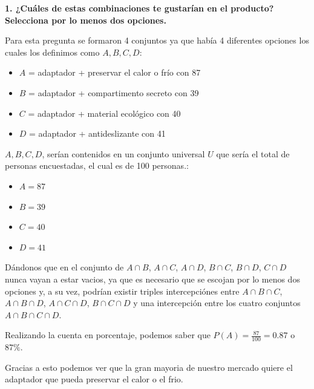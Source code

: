 \textbf{1. ¿Cuáles de estas combinaciones te gustarían en el producto? Selecciona por lo menos dos opciones.}

\tab Para esta pregunta se formaron 4 conjuntos ya que había 4 diferentes opciones los cuales los definimos como $A,B,C,D$:

\begin{itemize}
    \item $A$ = adaptador + preservar el calor o frío con 87
    \item $B$ = adaptador + compartimento secreto con 39
    \item $C$ = adaptador + material ecológico con 40
    \item $D$ = adaptador + antideslizante con 41
\end{itemize}

\tab $A,B,C,D$, serían contenidos en un conjunto universal $U$ que sería el total de personas encuestadas, el cual es de 100 personas.:

\begin{itemize}
    \item $A = 87$
    \item $B = 39$
    \item $C = 40$
    \item $D = 41$
\end{itemize}

\tab Dándonos que en el conjunto de $A\cap B$, $A\cap C$, $A\cap D$, $B\cap C$, $B\cap D$, $C\cap D$ nunca vayan a estar vacios, ya que es necesario que se escojan por lo menos dos opciones y, a su vez, podrían existir triples intercepciónes entre $A\cap B\cap C$, $A\cap B\cap D$, $A\cap C\cap D$, $B\cap C\cap D$ y una intercepción entre los cuatro conjuntos $A\cap B\cap C\cap D$.

\tab Realizando la cuenta en porcentaje, podemos saber que $P(A) = \frac{87}{100} = 0.87$ o $87\%$.

\tab Gracias a esto podemos ver que la gran mayoria de nuestro mercado quiere el adaptador que pueda preservar el calor o el frio.

